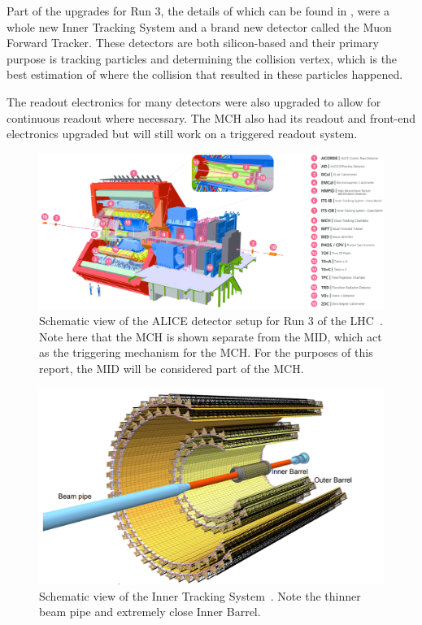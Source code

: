 Part of the upgrades for Run 3, the details of which can be found in \cite{ALICE_Upgrade_LOI}, were a whole new Inner Tracking System and a brand new detector called the Muon Forward Tracker. These detectors are both silicon-based and their primary purpose is tracking particles and determining the collision vertex, which is the best estimation of where the collision that resulted in these particles happened. 

The readout electronics for many detectors were also upgraded to allow for continuous readout where necessary. The MCH also had its readout and front-end electronics upgraded but will still work on a triggered readout system.

\begin{figure}[h]
    \begin{center}
        \includegraphics[width=\textwidth]{Figs/ALICE_RUN3_schematic.png}
        \caption{Schematic view of the ALICE detector setup for Run 3 of the LHC~\cite{ALICE_schematic_labels}. Note here that the MCH is shown separate from the MID, which act as the triggering mechanism for the MCH. For the purposes of this report, the MID will be considered part of the MCH.}
        \label{fig:ALICE_Schematic}
    \end{center}
\end{figure}

\begin{figure}[H]
    \begin{center}
        \includegraphics[width=.8\textwidth]{Figs/ITS_Schematic.png}
        \caption{Schematic view of the Inner Tracking System~\cite{ITS_Upgrade_TDR}. Note the thinner beam pipe and extremely close Inner Barrel.}
        \label{fig:ITS_Schematic}
    \end{center}
\end{figure}

